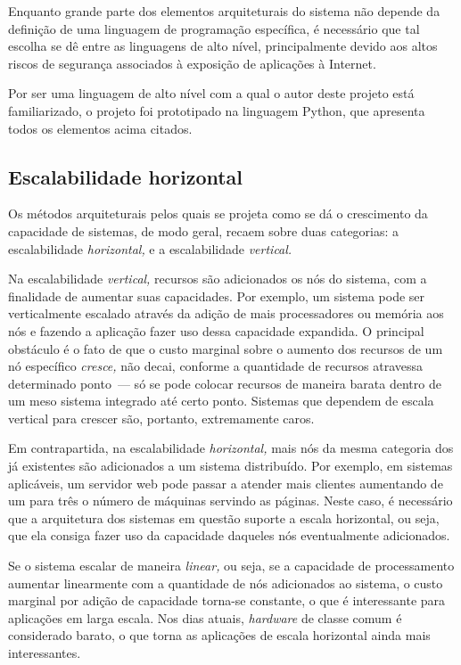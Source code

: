 \documentclass[ruledheader, 12pt]{abnt}
\begin{document}
Enquanto grande parte dos elementos arquiteturais do sistema não depende da definição de uma linguagem de programação específica, é necessário que tal escolha se dê entre as linguagens de alto nível, principalmente devido aos altos riscos de segurança associados à exposição de aplicações à Internet.

Por ser uma linguagem de alto nível com a qual o autor deste projeto está familiarizado, o projeto foi prototipado na linguagem Python, que apresenta todos os elementos acima citados.

\subsection{Escalabilidade horizontal}

Os métodos arquiteturais pelos quais se projeta como se dá o crescimento da capacidade de sistemas, de modo geral, recaem sobre duas categorias: a escalabilidade \emph{horizontal,} e a escalabilidade \emph{vertical.}

Na escalabilidade \emph{vertical,} recursos são adicionados os nós do sistema, com a finalidade de aumentar suas capacidades. Por exemplo, um sistema pode ser verticalmente escalado através da adição de mais processadores ou memória aos nós e fazendo a aplicação fazer uso dessa capacidade expandida. O principal obstáculo é o fato de que o custo marginal sobre o aumento dos recursos de um nó específico \emph{cresce,} não decai, conforme a quantidade de recursos atravessa determinado ponto~--- só se pode colocar recursos de maneira barata dentro de um meso sistema integrado até certo ponto. Sistemas que dependem de escala vertical para crescer são, portanto, extremamente caros.

Em contrapartida, na escalabilidade \emph{horizontal,} mais nós da mesma categoria dos já existentes são adicionados a um sistema distribuído. Por exemplo, em sistemas aplicáveis, um servidor web pode passar a atender mais clientes aumentando de um para três o número de máquinas servindo as páginas. Neste caso, é necessário que a arquitetura dos sistemas em questão suporte a escala horizontal, ou seja, que ela consiga fazer uso da capacidade daqueles nós eventualmente adicionados.

Se o sistema escalar de maneira \emph{linear,} ou seja, se a capacidade de processamento aumentar linearmente com a quantidade de nós adicionados ao sistema, o custo marginal por adição de capacidade torna-se constante, o que é interessante para aplicações em larga escala. Nos dias atuais, \emph{hardware} de classe comum é considerado barato, o que torna as aplicações de escala horizontal ainda mais interessantes.
\end{document}
